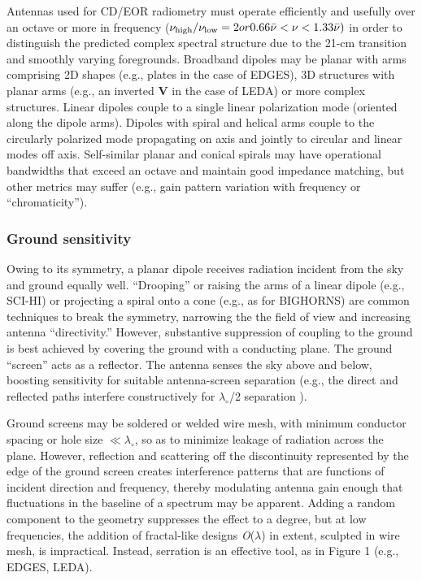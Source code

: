 Antennas used for CD/EOR radiometry must operate efficiently and usefully over an octave or more in frequency ($\nu_{\rm high}/\nu_{\rm low}=2 or 0.66\Bar{\nu}<\nu<1.33\Bar{\nu})$ in order to distinguish the predicted complex spectral structure due to the 21-cm transition and smoothly varying foregrounds.  Broadband dipoles may be planar with arms comprising 2D shapes (e.g., plates in the case of EDGES), 3D structures with planar arms (e.g., an inverted {\bf V} in the case of LEDA) or more complex structures.  Linear dipoles couple to a single linear polarization mode (oriented along the dipole arms).  Dipoles with spiral and helical arms couple to the circularly polarized mode propagating on axis and jointly to circular and linear modes off axis.
Self-similar planar and conical spirals may have operational bandwidths that exceed an octave and maintain good impedance matching, but other metrics may suffer (e.g., gain pattern variation with frequency or ``chromaticity''). 

\subsubsection{Ground sensitivity}

Owing to its symmetry, a planar dipole receives radiation incident from the sky and ground equally well.  ``Drooping'' or raising the arms of a linear dipole (e.g., SCI-HI) or projecting a spiral onto a cone (e.g., as for BIGHORNS) are common techniques to break the symmetry, narrowing the the field of view and increasing antenna ``directivity.''  However, substantive suppression of coupling to the ground is best achieved by covering the ground with a conducting plane.  The ground ``screen'' acts as a reflector.  The antenna senses the sky above and below, boosting sensitivity for suitable antenna-screen separation (e.g., the direct and reflected paths interfere constructively for $\lambda_\circ$/2 separation ). 

Ground screens may be soldered or welded wire mesh, with minimum conductor spacing or hole size $\ll \lambda_\circ$, so as to minimize leakage of radiation across the plane.  However, reflection and scattering off the discontinuity represented by the edge of the ground screen creates interference patterns that are functions of incident direction and frequency, thereby modulating antenna gain enough that fluctuations in the baseline of a spectrum may be apparent.  Adding a random component to the geometry suppresses the effect to a degree, but at low frequencies, the addition of fractal-like designs {\it O}($\lambda$) in extent, sculpted in wire mesh, is impractical.  Instead, serration is an effective tool, as in Figure 1 (e.g., EDGES, LEDA).

